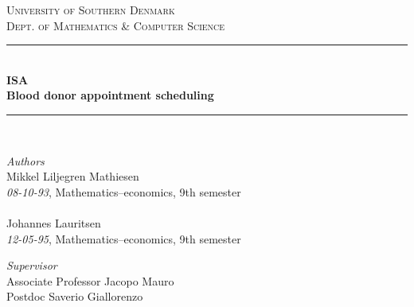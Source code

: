\documentclass[a4paper,12pt]{article}
\begin{document}
	\begin{titlepage} %
		\newcommand{\HRule}{\rule{\linewidth}{0.5mm}} %
		
		\center %
		
		
		\textsc{\LARGE University of Southern Denmark}\\[0.5cm] %
		
		\textsc{\Large Dept. of Mathematics \& Computer Science
         }\\[0.5cm] %
		
		
		\HRule\\[0.2cm]
		
		{\huge\bfseries ISA \\ [0.4cm] Blood donor appointment scheduling
		}\\[0.4cm] %
		
		\HRule\\[2 cm]
		
		
	
		\begin{flushleft}
			\large
			\textit{Authors}\\
			Mikkel Liljegren Mathiesen\\
			\textit{08-10-93}, Mathematics–economics, 9th semester\\
			\ \\
			Johannes Lauritsen\\
			\textit{12-05-95}, Mathematics–economics, 9th semester
		\end{flushleft}
		
		\begin{flushleft}
			\large
			\textit{Supervisor}\\
			Associate Professor Jacopo Mauro\\
			Postdoc Saverio Giallorenzo
			

		\end{flushleft}


\end{titlepage}
\end{document}
